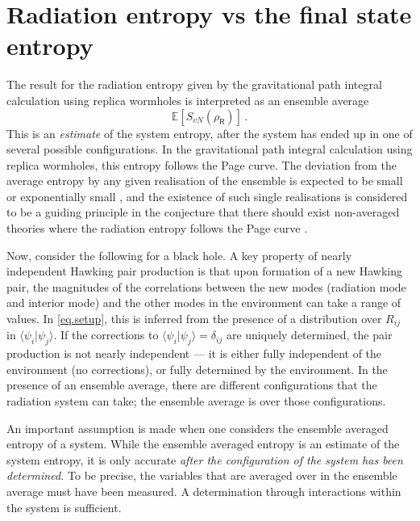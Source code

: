 \documentclass[12pt]{article}
\def\be{\begin{equation}}
\def\ee{\end{equation}}
\numberwithin{equation}{section}
\begin{document}
\section{Radiation entropy vs the final state entropy}\label{s.ent}
The result for the radiation entropy given by the gravitational path integral calculation using replica wormholes is interpreted as an ensemble average
\be\label{eq.estS}
\mathbb{E}\left[S_{vN}(\rho_\textsf{R})\right]\,.
\ee
This is an \emph{estimate} of the system entropy, after the system has ended up in one of several possible configurations. In the gravitational path integral calculation using replica wormholes, this entropy follows the Page curve. The deviation from the average entropy by any given realisation of the ensemble is expected to be small \cite{Penington:2019kki} or exponentially small \cite{Marolf:2020rpm}, and the existence of such single realisations is considered to be a guiding principle \cite{Penington:2019kki} in the conjecture that there should exist non-averaged theories where the radiation entropy follows the Page curve \cite{Penington:2019kki,Almheiri:2019qdq}.

Now, consider the following for a black hole. A key property of nearly independent Hawking pair production is that upon formation of a new Hawking pair, the magnitudes of the correlations between the new modes (radiation mode and interior mode) and the other modes in the environment can take a range of values. In \eqref{eq.setup}, this is inferred from the presence of a distribution over $R_{ij}$ in $\langle \psi_i|\psi_j\rangle$. If the corrections to $\langle \psi_i|\psi_j\rangle=\delta_{ij}$ are uniquely determined, the pair production is not nearly independent --- it is either fully independent of the environment (no corrections), or fully determined by the environment. In the presence of an ensemble average, there are different configurations that the radiation system can take; the ensemble average is over those configurations.

An important assumption is made when one considers the ensemble averaged entropy of a system. While the ensemble averaged entropy is an estimate of the system entropy, it is only accurate {\it after the configuration of the system has been determined.} To be precise, the variables that are averaged over in the ensemble average must have been measured. A determination through interactions within the system is sufficient.
\end{document}
